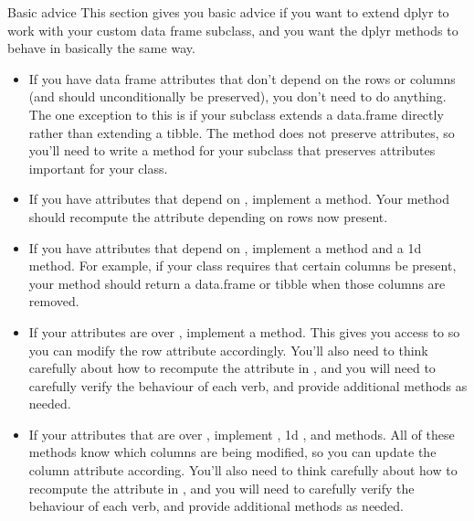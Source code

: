 \documentclass[a4paper]{book}
\begin{document}
\begin{Section}{Basic advice}
This section gives you basic advice if you want to extend dplyr to work with
your custom data frame subclass, and you want the dplyr methods to behave
in basically the same way.
\begin{itemize}

\item{} If you have data frame attributes that don't depend on the rows or columns
(and should unconditionally be preserved), you don't need to do anything.
The one exception to this is if your subclass extends a data.frame
directly rather than extending a tibble. The \AsIs{\texttt{[.data.frame}} method does not
preserve attributes, so you'll need to write a \code{[} method for your subclass
that preserves attributes important for your class.
\item{} If you have  attributes that depend on , implement a
 method. Your method should recompute the attribute
depending on rows now present.
\item{} If you have  attributes that depend on , implement a
 method and a 1d \code{[} method. For example, if your
class requires that certain columns be present, your method should return
a data.frame or tibble when those columns are removed.
\item{} If your attributes are  over , implement a
 method. This gives you access to  so you can
modify the row attribute accordingly. You'll also need to think carefully
about how to recompute the attribute in , and
you will need to carefully verify the behaviour of each verb, and provide
additional methods as needed.
\item{} If your attributes that are  over , implement
, 1d \code{[}, and  methods. All of these methods
know which columns are being modified, so you can update the column
attribute according. You'll also need to think carefully about how to
recompute the attribute in , and you will need to
carefully verify the behaviour of each verb, and provide additional
methods as needed.

\end{itemize}

\end{Section}
%
\end{document}
